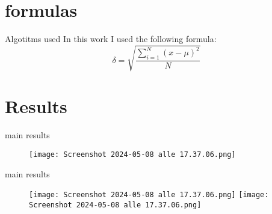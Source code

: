 \documentclass{beamer} %
\begin{document}
\section{formulas}

\begin{frame}{Algotitms used} %
In this work I used the following formula:
\bigskip
\begin{equation}
    \delta = \sqrt{\frac{\displaystyle\sum_{i=1}^{N}{(x - \mu)^2}}{N}}
\end{equation}
    
\end{frame}

\section{Results} %

\begin{frame}{main results}

\begin{figure} %
    \centering %
    \texttt{[image: Screenshot 2024-05-08 alle 17.37.06.png]} %
    \label{fig:enter-label} %
\end{figure}
    
\end{frame}

\begin{frame}{main results}
\begin{figure} %
    \centering %
    \texttt{[image: Screenshot 2024-05-08 alle 17.37.06.png]} 
    \pause \texttt{[image: Screenshot 2024-05-08 alle 17.37.06.png]} 
\end{figure} %

\end{frame}
\end{document}
